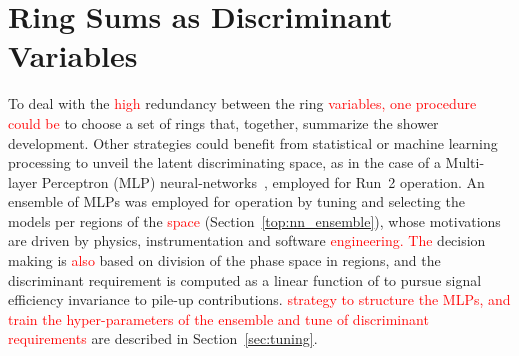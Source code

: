 \section{Ring Sums as Discriminant Variables}\label{ssec:ringer_id}


To deal with the \textcolor{red}{high} redundancy between the ring 
\textcolor{red}{variables, one procedure could be}
to choose a set of rings that, together,
summarize the shower development. Other strategies could benefit from statistical
or machine learning processing to unveil the latent discriminating space, as in
the case of a Multi-layer Perceptron (MLP) neural-networks~\cite{haykin_2008},
employed for Run~2 operation. 
An ensemble of MLPs was employed for operation by tuning and selecting
the models per regions of the \eteta \textcolor{red}{space} (Section~\ref{top:nn_ensemble}), whose
motivations are driven by physics, instrumentation and software 
\textcolor{red}{engineering. The \rnn}
decision making is \textcolor{red}{also} based on division of the phase space in regions, and the discriminant requirement is
computed as a linear function of \avgmu to pursue signal efficiency invariance
to pile-up contributions. 
\textcolor{red}{strategy to structure the MLPs,  and train the hyper-parameters of the ensemble and tune of discriminant requirements }
are described in Section~\ref{sec:tuning}.


